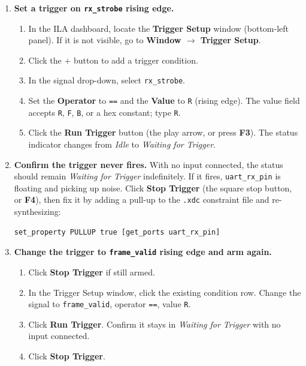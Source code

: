 \documentclass[11pt,letterpaper]{article}
\begin{document}
\begin{enumerate}[leftmargin=2em]

	\item \textbf{Set a trigger on \texttt{rx\_strobe} rising edge.}
	\begin{enumerate}[label=\alph*.]
		\item In the \mbox{ILA} dashboard, locate the \textbf{Trigger Setup} window (bottom-left panel). If it is not visible, go to \textbf{Window $\to$ Trigger Setup}.
		\item Click the \textbf{$+$} button to add a trigger condition.
		\item In the signal drop-down, select \texttt{rx\_strobe}.
		\item Set the \textbf{Operator} to \texttt{==} and the \textbf{Value} to \texttt{R} (rising edge). The value field accepts \texttt{R}, \texttt{F}, \texttt{B}, or a hex constant; type \texttt{R}.
		\item Click the \textbf{Run Trigger} button (the play arrow, or press \textbf{F3}). The status indicator changes from \textit{Idle} to \textit{Waiting for Trigger}.
	\end{enumerate}

	\item \textbf{Confirm the trigger never fires.}
	With no input connected, the status should remain \textit{Waiting for Trigger} indefinitely. If it fires, \texttt{uart\_rx\_pin} is floating and picking up noise. Click \textbf{Stop Trigger} (the square stop button, or \textbf{F4}), then fix it by adding a pull-up to the \texttt{.xdc} constraint file and re-synthesizing:
	\begin{verbatim}
set_property PULLUP true [get_ports uart_rx_pin]
	\end{verbatim}

	\item \textbf{Change the trigger to \texttt{frame\_valid} rising edge and arm again.}
	\begin{enumerate}[label=\alph*.]
		\item Click \textbf{Stop Trigger} if still armed.
		\item In the Trigger Setup window, click the existing condition row. Change the signal to \texttt{frame\_valid}, operator \texttt{==}, value \texttt{R}.
		\item Click \textbf{Run Trigger}. Confirm it stays in \textit{Waiting for Trigger} with no input connected.
		\item Click \textbf{Stop Trigger}.
	\end{enumerate}


\end{enumerate}
\end{document}
